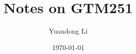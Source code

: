 \documentclass[a4paper,11pt]{article}
\title{Notes on GTM251}
\author{Yuandong Li}
\date{\today}
\begin{document}
\maketitle

\tableofcontents
\newpage






\def\ChapOne{chap1}
 

\clearpage

\def\ChapTwo{chap2}
 
\end{document}
